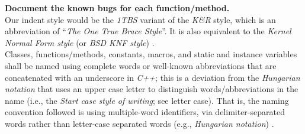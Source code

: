 \documentclass[letter,12pt]{article}
\begin{document}
{\bf Document the known bugs for each function/method.} \\

Our indent style would be the {\it 1TBS} variant of the {\it K{\rm \&}R} style, which is an abbreviation of ``{\it The One True Brace Style}''. It is also equivalent to the {\it Kernel Normal Form style} (or {\it BSD KNF style}) \cite{WikipediaContributors2016j}. \\

Classes, functions/methods, constants, macros, and static and instance variables shall be named using complete words or well-known abbreviations that are concatenated with an underscore in {\it C++}; this is a deviation from the {\it Hungarian notation} that uses an upper case letter to distinguish words/abbreviations in the name (i.e., the {\it Start case style of writing}; see letter case). That is, the naming convention followed is using multiple-word identifiers, via delimiter-separated words rather than letter-case separated words (e.g., {\it Hungarian notation}) \cite{WikipediaContributors2017}. \\
\end{document}
